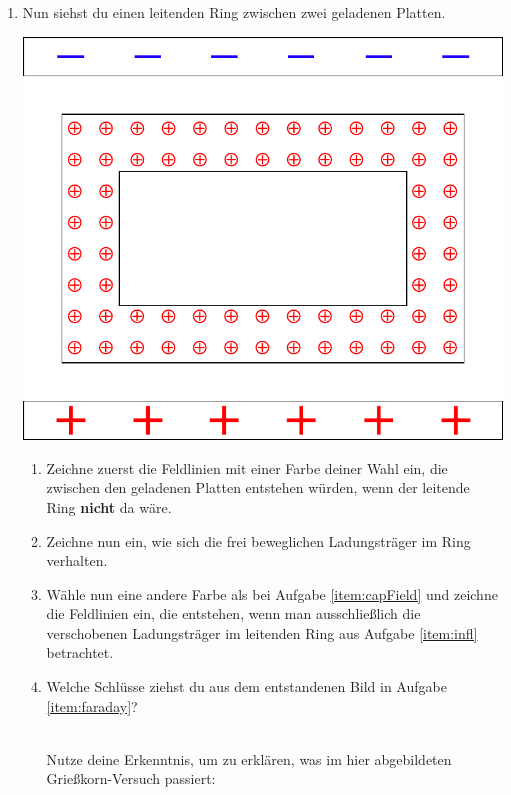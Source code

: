 \documentclass[task=1]{exercise}
\begin{document}
\begin{enumerate}
  \item Nun siehst du einen leitenden Ring zwischen zwei geladenen Platten.
  \begin{center}
    \vspace{.5cm}
    \includegraphics[width=.5\textwidth]{images/influenceFaraday.pdf}
    \vspace{.5cm}
  \end{center}
    \begin{enumerate}[label=\textnormal{\arabic*)}]
    \item\label{item:capField} Zeichne zuerst die Feldlinien mit einer Farbe deiner Wahl ein, die zwischen den geladenen Platten entstehen würden, wenn der leitende Ring {\bfseries nicht} da wäre.
    \item\label{item:infl} Zeichne nun ein, wie sich die frei beweglichen Ladungsträger im Ring verhalten.
    \item\label{item:faraday} Wähle nun eine andere Farbe als bei Aufgabe \ref{item:capField} und zeichne die Feldlinien ein, die entstehen, wenn man ausschließlich die verschobenen Ladungsträger im leitenden Ring aus Aufgabe \ref{item:infl} betrachtet.
    \item Welche Schlüsse ziehst du aus dem entstandenen Bild in Aufgabe \ref{item:faraday}?\\~\\
    \begin{minipage}[t]{.45\linewidth}
      Nutze deine Erkenntnis, um zu erklären, was im hier abgebildeten Grießkorn-Versuch passiert:
    \end{minipage}
    \hfill
    \begin{minipage}[t]{.4\linewidth}
    \vspace{.1cm}

\end{minipage}
\end{enumerate}
\end{enumerate}
\end{document}
